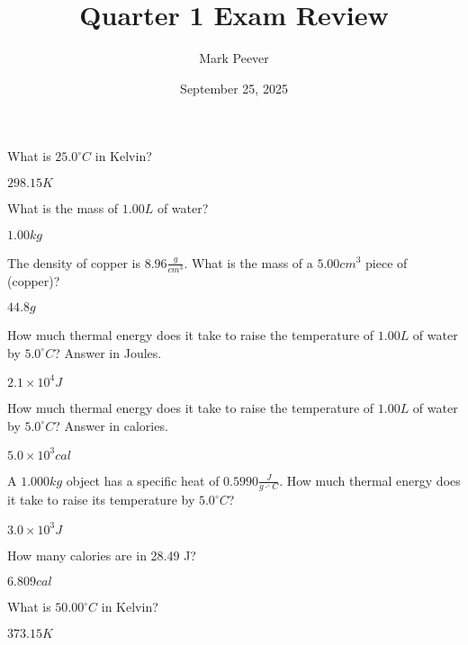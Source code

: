 \documentclass[11pt,addpoints]{exam}   	%
\title{Quarter 1 Exam Review}
\author{Mark Peever}
\date{September 25, 2025}							%
\begin{document}
\maketitle

\pointsinrightmargin
\printanswers

\begin{center}
\end{center}
\vspace{0.2in}

\begin{questions}
\question What is $25.0^{\circ}C$ in Kelvin?  
\begin{solution}
$298.15 K$
\end{solution}

\question What is the mass of $1.00 L$ of  water?
\begin{solution}
$1.00 kg$
\end{solution} 

\question The density of copper is $8.96 \frac{g}{cm^{3}}$. What is the mass of a $5.00 cm^3$ piece of  (copper)?
\begin{solution}
 $44.8 g$
\end{solution} 

\question How much thermal energy does it take to raise the temperature of $1.00 L$ of water by $5.0^{\circ}C$? Answer in Joules.
\begin{solution}
 $2.1 \times 10^4 J$
\end{solution} 

\pagebreak
\question How much thermal energy does it take to raise the temperature of $1.00 L$ of water by $5.0^{\circ}C$? Answer in calories.
\begin{solution}
 $5.0 \times 10^3 cal$
\end{solution} 

\question A $1.000 kg$ object has a specific heat of  $0.5990 \frac{J}{g \cdot ^{\circ}C}$.
How much thermal energy does it take to raise its temperature by $5.0^{\circ}C$? 
\begin{solution}
 $3.0 \times 10^3 J$
\end{solution} 

\question How many calories are in 28.49 J?
\begin{solution}
$6.809 cal$
\end{solution}

\question What is $50.00 ^{\circ}C$ in Kelvin?
\begin{solution}
$373.15 K$
\end{solution}

\end{questions}
\end{document}
